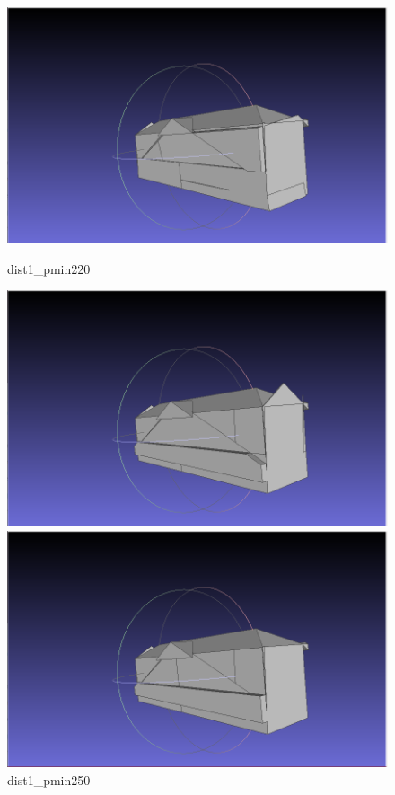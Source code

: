 \documentclass{article}
\begin{document}
\begin{figure}[H]
    \centering
    \begin{minipage}[b]{0.45\textwidth}
      \includegraphics[width=\textwidth]{../../images/screen_kinetic/dist1_pmin220.png}
      \caption{dist1\_pmin220}
      \label{fig:dist1_pmin220}
    \end{minipage}
    \hfill
    \begin{minipage}[b]{0.45\textwidth}
      \includegraphics[width=\textwidth]{../../images/screen_kinetic/dist1_pmin250.png}
      \caption{dist1\_pmin250}
      \label{fig:dist1_pmin250}
    \end{minipage}
    \hfill
    \begin{minipage}[b]{0.45\textwidth}
      \includegraphics[width=\textwidth]{../../images/screen_kinetic/dist1_pmin280.png}

\end{minipage}
\end{figure}
\end{document}
